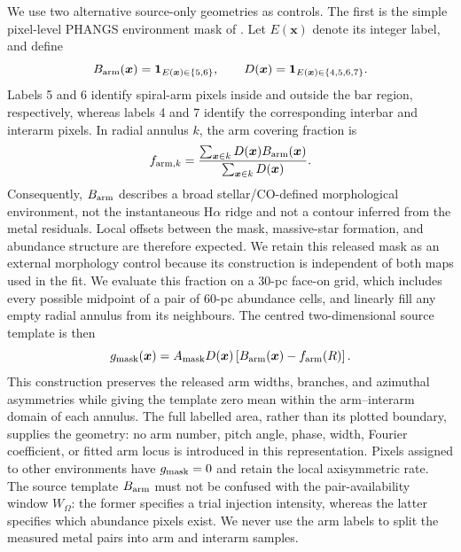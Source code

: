 \documentclass[fleqn,usenatbib]{mnras}
\newcommand{\bs}[1]{\boldsymbol{#1}}
\begin{document}
We use two alternative source-only geometries as controls.  The first is the simple pixel-level PHANGS environment mask of \citet{Querejeta2021}.  Let $E(\bs{x})$ denote its integer label, and define
\begin{equation}
    B_{\rm arm}(\bs{x})=
    \boldsymbol{1}_{E(\bs{x})\in\{5,6\}},
    \qquad
    D(\bs{x})=\boldsymbol{1}_{E(\bs{x})\in\{4,5,6,7\}}.
    \label{eq:phangs_arm_indicator}
\end{equation}
Labels 5 and 6 identify spiral-arm pixels inside and outside the bar region, respectively, whereas labels 4 and 7 identify the corresponding interbar and interarm pixels.  In radial annulus $k$, the arm covering fraction is
\begin{equation}
    f_{{\rm arm},k}=
    \frac{\sum_{\bs{x}\in k}D(\bs{x})B_{\rm arm}(\bs{x})}
    {\sum_{\bs{x}\in k}D(\bs{x})}.
    \label{eq:phangs_arm_fraction}
\end{equation}
Consequently, $B_{\rm arm}$ describes a broad stellar/CO-defined morphological environment, not the instantaneous H$\alpha$ ridge and not a contour inferred from the metal residuals.  Local offsets between the mask, massive-star formation, and abundance structure are therefore expected.  We retain this released mask as an external morphology control because its construction is independent of both maps used in the fit.
We evaluate this fraction on a 30-pc face-on grid, which includes every possible midpoint of a pair of 60-pc abundance cells, and linearly fill any empty radial annulus from its neighbours.  The centred two-dimensional source template is then
\begin{equation}
    g_{\rm mask}(\bs{x})=
    A_{\rm mask}D(\bs{x})
    \left[B_{\rm arm}(\bs{x})-f_{\rm arm}(R)\right].
    \label{eq:phangs_mask_template}
\end{equation}
This construction preserves the released arm widths, branches, and azimuthal asymmetries while giving the template zero mean within the arm--interarm domain of each annulus.  The full labelled area, rather than its plotted boundary, supplies the geometry: no arm number, pitch angle, phase, width, Fourier coefficient, or fitted arm locus is introduced in this representation.  Pixels assigned to other environments have $g_{\rm mask}=0$ and retain the local axisymmetric rate.  The source template $B_{\rm arm}$ must not be confused with the pair-availability window $W_\Omega$: the former specifies a trial injection intensity, whereas the latter specifies which abundance pixels exist.  We never use the arm labels to split the measured metal pairs into arm and interarm samples.
\end{document}
